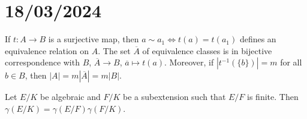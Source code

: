 \section{18/03/2024}

If $t\colon A\to B$ is a surjective map, then 
$a\sim a_1\Longleftrightarrow t(a)=t(a_1)$ 
defines an equivalence relation on $A$. The set $\overline{A}$ 
of equivalence classes is in bijective correspondence with $B$,
$\overline{A}\to B$, $\overline{a}\mapsto t(a)$. 
Moreover, if $|t^{-1}(\{b\})|=m$ for all $b\in B$, then 
$|A|=m|\overline{A}|=m|B|$. 

\begin{proposition}
    Let $E/K$ be algebraic and $F/K$ be a subextension such that 
    $E/F$ is finite. Then $\gamma(E/K)=\gamma(E/F)\gamma(F/K)$. 
\end{proposition}

